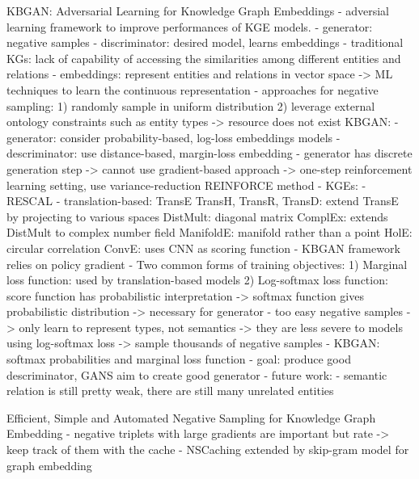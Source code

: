 \cite{cai2017kbgan}
KBGAN: Adversarial Learning for Knowledge Graph Embeddings
- adversial learning framework to improve performances of KGE models.
- generator: negative samples
- discriminator: desired model, learns embeddings
- traditional KGs: lack of capability of accessing the similarities among different entities and relations
- embeddings: represent entities and relations in vector space -> ML techniques to learn the continuous representation
- approaches for negative sampling:
1) randomly sample in uniform distribution
2) leverage external ontology constraints such as entity types
-> resource does not exist
KBGAN:
- generator: consider probability-based, log-loss embeddings models 
- descriminator: use distance-based, margin-loss embedding
- generator has discrete generation step -> cannot use gradient-based approach
-> one-step reinforcement learning setting, use variance-reduction REINFORCE method 
- KGEs: 
    - RESCAL
    - translation-based:
        TransE
        TransH, TransR, TransD: extend TransE by projecting to various spaces
        DistMult: diagonal matrix
        ComplEx: extends DistMult to complex number field
        ManifoldE: manifold rather than a point
        HolE: circular correlation
        ConvE: uses CNN as scoring function
- KBGAN framework relies on policy gradient
- Two common forms of training objectives:
    1) Marginal loss function: used by translation-based models
    2) Log-softmax loss function: score function has probabilistic interpretation
    -> softmax function gives probabilistic distribution -> necessary for generator
- too easy negative samples -> only learn to represent types, not semantics
-> they are less severe to models using log-softmax loss -> sample thousands of negative samples
- KBGAN: softmax probabilities and marginal loss function
- goal: produce good descriminator, GANS aim to create good generator
- future work:
    - semantic relation is still pretty weak, there are still many unrelated entities 

    
\cite{zhang2020efficient}
Efficient, Simple and Automated Negative Sampling for Knowledge Graph Embedding
- negative triplets with large gradients are important but rate 
-> keep track of them with the cache
- NSCaching extended by skip-gram model for graph embedding